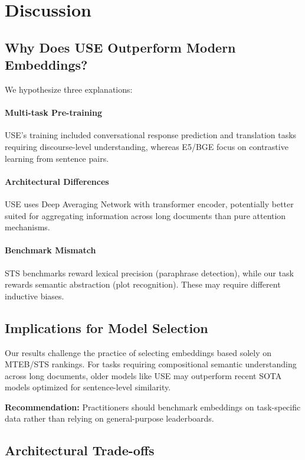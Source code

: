 \documentclass[11pt,a4paper]{article}
\begin{document}
\section{Discussion}

\subsection{Why Does USE Outperform Modern Embeddings?}

We hypothesize three explanations:

\paragraph{Multi-task Pre-training} USE's training included conversational response prediction and translation tasks requiring discourse-level understanding, whereas E5/BGE focus on contrastive learning from sentence pairs.

\paragraph{Architectural Differences} USE uses Deep Averaging Network with transformer encoder, potentially better suited for aggregating information across long documents than pure attention mechanisms.

\paragraph{Benchmark Mismatch} STS benchmarks reward lexical precision (paraphrase detection), while our task rewards semantic abstraction (plot recognition). These may require different inductive biases.

\subsection{Implications for Model Selection}

Our results challenge the practice of selecting embeddings based solely on MTEB/STS rankings. For tasks requiring compositional semantic understanding across long documents, older models like USE may outperform recent SOTA models optimized for sentence-level similarity.

\textbf{Recommendation:} Practitioners should benchmark embeddings on task-specific data rather than relying on general-purpose leaderboards.

\subsection{Architectural Trade-offs}
\end{document}
